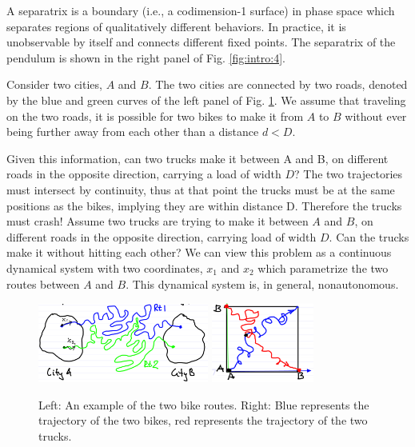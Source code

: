 \begin{ex}[Pendulum]
\begin{figure}[H]
\end{figure}
\begin{definition}[Separatrix]
	A separatrix is a boundary (i.e., a codimension-1 surface) in phase space which separates regions of qualitatively different behaviors. In practice, it is unobservable by itself and connects different fixed points. The separatrix of the pendulum is shown in the right panel of Fig. \ref{fig:intro:4}. 
\end{definition}

\end{ex}

\begin{ex}
	Consider two cities, $A$ and $B$. The two cities are connected by two roads, denoted by the blue and green curves of the left panel of Fig. \ref{fig:intro:5}. We assume that traveling on the two roads, it is possible for two bikes to make it from $A$ to $B$ without ever being further away from each other than a distance $d<D$. 
	
	Given this information, can two trucks make it between A and B, on different roads in the opposite direction, carrying a load of width $D$?
The two trajectories must intersect by continuity, thus at that point the trucks must be at the same positions as the bikes, implying they are within distance D. Therefore the trucks must crash!
	Assume two trucks are trying to make it between $A$ and $B$, on different roads in the opposite direction, carrying load of width $D$. Can the trucks make it without hitting each other? We can view this problem as a continuous dynamical system with two coordinates, $x_1$ and $x_2$ which parametrize the two routes between $A$ and $B$. This dynamical system is, in general, nonautonomous. 
		\begin{figure}[H]
		\centering
		\includegraphics[width=0.5\textwidth]{figures/intro/7routes.png}
		\hspace{0.05\textwidth}
		\includegraphics[width=0.3\textwidth]{figures/intro/8truck_geometry.png}
		\caption{Left: An example of the two bike routes. Right: Blue represents the trajectory of the two bikes, red represents the trajectory of the two trucks.}
		\label{fig:intro:5}
	\end{figure}
	

\end{ex}
